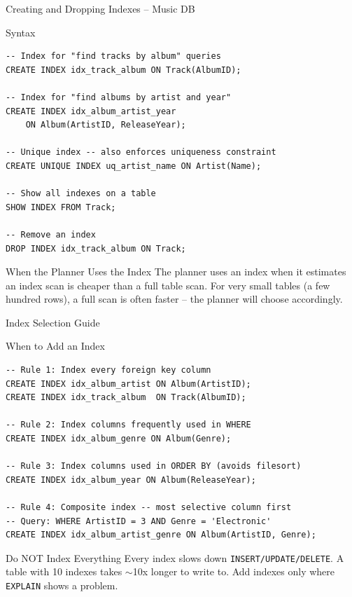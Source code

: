 \begin{frame}[fragile]{Creating and Dropping Indexes -- Music DB}
  \begin{block}{Syntax}
\begin{lstlisting}[style=sqlstyle]
-- Index for "find tracks by album" queries
CREATE INDEX idx_track_album ON Track(AlbumID);

-- Index for "find albums by artist and year"
CREATE INDEX idx_album_artist_year
    ON Album(ArtistID, ReleaseYear);

-- Unique index -- also enforces uniqueness constraint
CREATE UNIQUE INDEX uq_artist_name ON Artist(Name);

-- Show all indexes on a table
SHOW INDEX FROM Track;

-- Remove an index
DROP INDEX idx_track_album ON Track;
\end{lstlisting}
  \end{block}

  \begin{block}{When the Planner Uses the Index}
    The planner uses an index when it estimates an index scan is cheaper than
    a full table scan. For very small tables (a few hundred rows), a full scan
    is often faster -- the planner will choose accordingly.
  \end{block}
\end{frame}

\begin{frame}[fragile]{Index Selection Guide}
  \begin{block}{When to Add an Index}
\begin{lstlisting}[style=sqlstyle]
-- Rule 1: Index every foreign key column
CREATE INDEX idx_album_artist ON Album(ArtistID);
CREATE INDEX idx_track_album  ON Track(AlbumID);

-- Rule 2: Index columns frequently used in WHERE
CREATE INDEX idx_album_genre ON Album(Genre);

-- Rule 3: Index columns used in ORDER BY (avoids filesort)
CREATE INDEX idx_album_year ON Album(ReleaseYear);

-- Rule 4: Composite index -- most selective column first
-- Query: WHERE ArtistID = 3 AND Genre = 'Electronic'
CREATE INDEX idx_album_artist_genre ON Album(ArtistID, Genre);
\end{lstlisting}
  \end{block}

  \begin{alertblock}{Do NOT Index Everything}
    Every index slows down \texttt{INSERT/UPDATE/DELETE}.
    A table with 10 indexes takes $\sim$10x longer to write to.
    Add indexes only where \texttt{EXPLAIN} shows a problem.
  \end{alertblock}
\end{frame}


